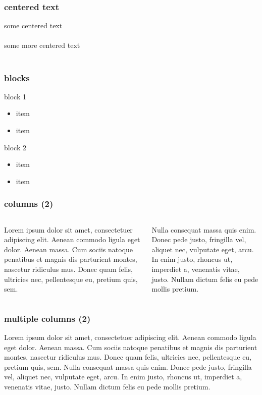 \begin{frame}
\frametitle{centered text}
\begin{center}
some centered text\\\mbox{}\\some more centered text\\\mbox{}\\
\end{center}
\end{frame}

\begin{frame}
\frametitle{blocks}
\begin{block}{block 1}
\begin{itemize}
\item item
\item item
\end{itemize}
\end{block}
\begin{block}{block 2}
\begin{itemize}
\item item
\item item
\end{itemize}
\end{block}
\end{frame}

\begin{frame}
\frametitle{columns (2)}
\begin{columns}
\begin{column}[t]{.5\textwidth}
\justifying
Lorem ipsum dolor sit amet, consectetuer adipiscing elit. Aenean commodo ligula eget dolor. Aenean massa. Cum sociis natoque penatibus et magnis dis parturient montes, nascetur ridiculus mus. Donec quam felis, ultricies nec, pellentesque eu, pretium quis, sem.
\end{column}
\hfill
\begin{column}[t]{.5\textwidth}
\justifying
Nulla consequat massa quis enim. Donec pede justo, fringilla vel, aliquet nec, vulputate eget, arcu. In enim justo, rhoncus ut, imperdiet a, venenatis vitae, justo. Nullam dictum felis eu pede mollis pretium.
\end{column}%
\end{columns}
\end{frame}

\begin{frame}
\frametitle{multiple columns (2)}
\setlength\columnsep{30pt}
\begin{multicols}{2}
\justifying
Lorem ipsum dolor sit amet, consectetuer adipiscing elit. Aenean commodo ligula eget dolor. Aenean massa. Cum sociis natoque penatibus et magnis dis parturient montes, nascetur ridiculus mus. Donec quam felis, ultricies nec, pellentesque eu, pretium quis, sem. Nulla consequat massa quis enim. Donec pede justo, fringilla vel, aliquet nec, vulputate eget, arcu. In enim justo, rhoncus ut, imperdiet a, venenatis vitae, justo. Nullam dictum felis eu pede mollis pretium.
\end{multicols}
\end{frame}

